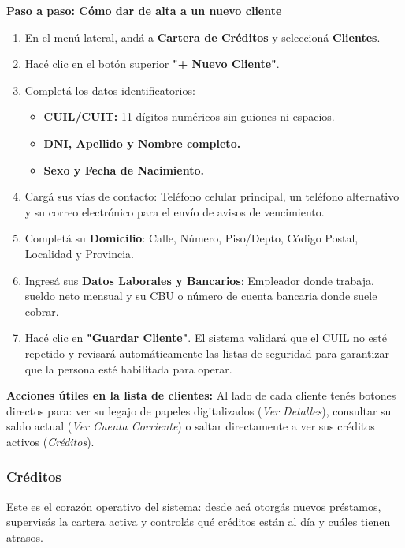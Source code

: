 \documentclass[12pt,a4paper]{article}
\renewcommand{\_}{\textunderscore\allowbreak}
\begin{document}
\textbf{Paso a paso: Cómo dar de alta a un nuevo cliente}
\begin{enumerate}
    \item En el menú lateral, andá a \textbf{Cartera de Créditos} y seleccioná \textbf{Clientes}.
    \item Hacé clic en el botón superior \textbf{"+ Nuevo Cliente"}.
    \item Completá los datos identificatorios:
          \begin{itemize}
              \item \textbf{CUIL/CUIT:} 11 dígitos numéricos sin guiones ni espacios.
              \item \textbf{DNI, Apellido y Nombre completo.}
              \item \textbf{Sexo y Fecha de Nacimiento.}
          \end{itemize}
    \item Cargá sus vías de contacto: Teléfono celular principal, un teléfono alternativo y su correo electrónico para el envío de avisos de vencimiento.
    \item Completá su \textbf{Domicilio}: Calle, Número, Piso/Depto, Código Postal, Localidad y Provincia.
    \item Ingresá sus \textbf{Datos Laborales y Bancarios}: Empleador donde trabaja, sueldo neto mensual y su CBU o número de cuenta bancaria donde suele cobrar.
    \item Hacé clic en \textbf{"Guardar Cliente"}. El sistema validará que el CUIL no esté repetido y revisará automáticamente las listas de seguridad para garantizar que la persona esté habilitada para operar.
\end{enumerate}

\textbf{Acciones útiles en la lista de clientes:}
Al lado de cada cliente tenés botones directos para: ver su legajo de papeles digitalizados (\textit{Ver Detalles}), consultar su saldo actual (\textit{Ver Cuenta Corriente}) o saltar directamente a ver sus créditos activos (\textit{Créditos}).

\subsubsection{Créditos}
Este es el corazón operativo del sistema: desde acá otorgás nuevos préstamos, supervisás la cartera activa y controlás qué créditos están al día y cuáles tienen atrasos.
\end{document}
